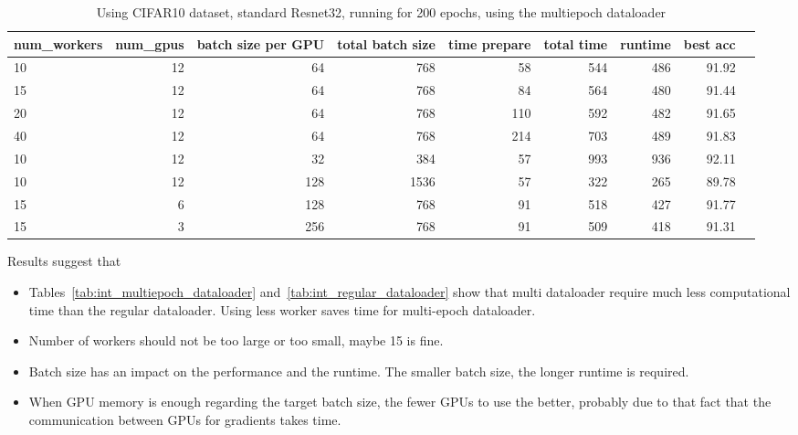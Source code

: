 \documentclass[11pt]{article}
\begin{document}
\begin{table}[!htp]\centering
\caption{Using CIFAR10 dataset, standard Resnet32, running for 200 epochs, using the multiepoch dataloader}\label{tab:cifar10_multiepoch_dataloader}
\scriptsize
\begin{tabular}{lrrrrrrrr}\toprule
num\_workers &num\_gpus &batch size per GPU &total batch size &time prepare &total time &runtime &best acc \\\midrule
10 &12 &64 &768 &58 &544 &486 &91.92 \\
15 &12 &64 &768 &84 &564 &480 &91.44 \\
20 &12 &64 &768 &110 &592 &482 &91.65 \\
40 &12 &64 &768 &214 &703 &489 &91.83 \\\midrule
10 &12 &32 &384 &57 &993 &936 &92.11 \\
10 &12 &128 &1536 &57 &322 &265 &89.78 \\\midrule
15 &6 &128 &768 &91 &518 &427 &91.77 \\
15 &3 &256 &768 &91 &509 &418 &91.31 \\
\bottomrule
\end{tabular}
\end{table}

Results suggest that
\begin{itemize}
	\item Tables~\ref{tab:int_multiepoch_dataloader} and~\ref{tab:int_regular_dataloader} show that multi dataloader require much less computational time than the regular dataloader. Using less worker saves time for multi-epoch dataloader. 
	\item Number of workers should not be too large or too small, maybe 15 is fine. 
	\item Batch size has an impact on the performance and the runtime. The smaller batch size, the longer runtime is required. 	
	\item When GPU memory is enough regarding the target batch size, the fewer GPUs to use the better, probably due to that fact that the communication between GPUs for gradients takes time. 
\end{itemize}

\newpage

 
\end{document}
